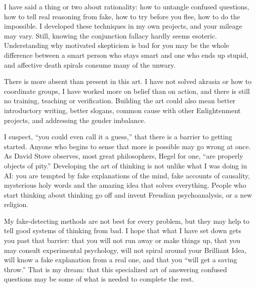 
I have said a thing or two about rationality: how to untangle confused questions, how to tell real reasoning from fake, how to try before you flee, how to do the impossible. I developed these techniques in my own projects, and your mileage may vary. Still, knowing the conjunction fallacy hardly seems esoteric. Understanding why motivated skepticism is bad for you may be the whole difference between a smart person who stays smart and one who ends up stupid, and affective death spirals consume many of the unwary.

There is more absent than present in this art. I have not solved akrasia or how to coordinate groups, I have worked more on belief than on action, and there is still no training, teaching or verification. Building the art could also mean better introductory writing, better slogans, common cause with other Enlightenment projects, and addressing the gender imbalance. 

I suspect, ``you could even call it a guess,'' that there is a barrier to getting started. Anyone who begins to sense that more is possible may go wrong at once. As David Stove observes, most great philosophers, Hegel for one, ``are properly objects of pity.'' Developing the art of thinking is not unlike what I was doing in AI: you are tempted by fake explanations of the mind, fake accounts of causality, mysterious holy words and the amazing idea that solves everything. People who start thinking about thinking go off and invent Freudian psychoanalysis, or a new religion. 

My fake-detecting methods are not best for every problem, but they may help to tell good systems of thinking from bad. I hope that what I have set down gets you past that barrier: that you will not run away or make things up, that you may consult experimental psychology, will not spiral around your Brilliant Idea, will know a fake explanation from a real one, and that you ``will get a saving throw.'' That is my dream: that this specialized art of answering confused questions may be some of what is needed to complete the rest.

